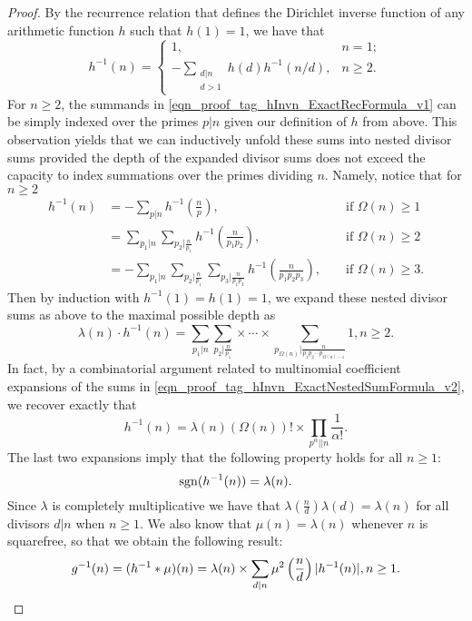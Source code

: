 \documentclass[11pt,reqno,a4letter]{article}
\numberwithin{figure}{section}
\numberwithin{table}{section}
\theoremstyle{plain}
\numberwithin{theorem}{section}
\theoremstyle{definition}
\begin{document}
\begin{proof}
By the recurrence relation that defines the Dirichlet inverse function of any 
arithmetic function $h$ such that $h(1) = 1$, we have that \cite[\S 2.7]{APOSTOLANUMT} 
\begin{equation} 
\label{eqn_proof_tag_hInvn_ExactRecFormula_v1}
h^{-1}(n) = \begin{cases} 
            1, & n = 1; \\ 
            -\sum\limits_{\substack{d|n \\ d>1}} h(d) h^{-1}(n/d), & n \geq 2. 
            \end{cases} 
\end{equation} 
For $n \geq 2$, the summands in \eqref{eqn_proof_tag_hInvn_ExactRecFormula_v1} 
can be simply indexed over the primes $p|n$ given our definition of $h$ from above. 
This observation yields that we can inductively 
unfold these sums into nested divisor sums provided the depth of the 
expanded divisor sums does not exceed the 
capacity to index summations over the primes dividing $n$. Namely, notice that for $n \geq 2$ 
\begin{align*} 
h^{-1}(n) & = -\sum_{p|n} h^{-1}\left(\frac{n}{p}\right), && \text{\ if\ } \Omega(n) \geq 1 \\ 
     & = \sum_{p_1|n} \sum_{p_2|\frac{n}{p_1}} h^{-1}\left(\frac{n}{p_1p_2}\right), && \text{\ if\ } \Omega(n) \geq 2 \\ 
     & = -\sum_{p_1|n} \sum_{p_2|\frac{n}{p_1}} \sum_{p_3|\frac{n}{p_1p_2}} h^{-1}\left(\frac{n}{p_1p_2p_3}\right), 
     && \text{\ if\ } \Omega(n) \geq 3. 
\end{align*} 
Then by induction with $h^{-1}(1) = h(1) = 1$, we expand these 
nested divisor sums as above to the maximal possible depth as 
\begin{equation} 
\label{eqn_proof_tag_hInvn_ExactNestedSumFormula_v2} 
\lambda(n) \cdot h^{-1}(n) = \sum_{p_1|n} \sum_{p_2|\frac{n}{p_1}} \times \cdots \times 
     \sum_{p_{\Omega(n)}|\frac{n}{p_1p_2 \cdots p_{\Omega(n)-1}}} 1, n \geq 2. 
\end{equation} 
In fact, by a combinatorial argument related to multinomial coefficient expansions of the sums in 
\eqref{eqn_proof_tag_hInvn_ExactNestedSumFormula_v2}, we recover exactly that 
\begin{equation} 
\label{eqn_proof_tag_hInvn_ExactNestedSumFormula_CombInterpetIdent_v3} 
h^{-1}(n) = \lambda(n) (\Omega(n))! \times \prod_{p^{\alpha} || n} \frac{1}{\alpha!}. 
\end{equation} 
The last two expansions imply that the following property holds for all $n \geq 1$: 
\begin{equation} 
\notag 
\operatorname{sgn}(h^{-1}(n)) = \lambda(n). 
\end{equation} 
Since $\lambda$ is completely multiplicative we have that 
$\lambda\left(\frac{n}{d}\right) \lambda(d) = \lambda(n)$ for all divisors 
$d|n$ when $n \geq 1$. We also know that $\mu(n) = \lambda(n)$ whenever $n$ is squarefree, 
so that we obtain the following result: 
\[
g^{-1}(n) = (h^{-1} \ast \mu)(n) = \lambda(n) \times \sum_{d|n} \mu^2\left(\frac{n}{d}\right) |h^{-1}(n)|, n \geq 1. 
     \qedhere 
\]
\end{proof} 
\end{document}
